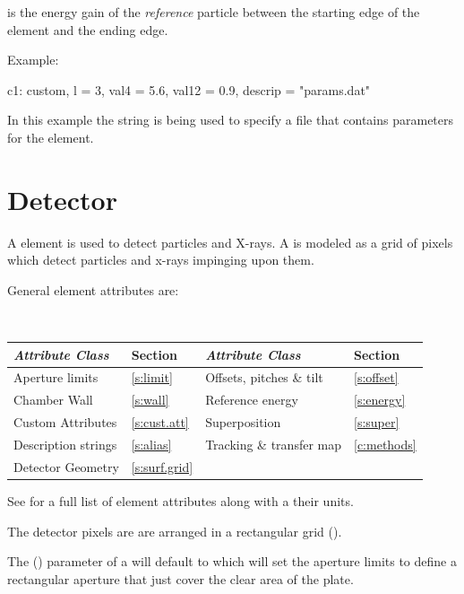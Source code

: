  is the energy gain of the {\it reference} particle
between the starting edge of the element and the ending edge.

Example:
\begin{example}
  c1: custom, l = 3, val4 = 5.6, val12 = 0.9, descrip = "params.dat"
\end{example}
In this example the  string is being used to specify a
file that contains parameters for the element.

\section{Detector}
\label{s:detector}

A  element is used to detect particles and X-rays.  A
 is modeled as a grid of pixels which detect particles and x-rays
impinging upon them.

General  element attributes are:
\begin{center}
\tt 
\begin{tabular}{llll} \toprule
  {\sl Attribute Class}      & Section           & {\sl Attribute Class}      & Section         \\ \midrule
  Aperture limits            & \ref{s:limit}     & Offsets, pitches \& tilt   & \ref{s:offset}  \\
  Chamber Wall               & \ref{s:wall}      & Reference energy           & \ref{s:energy}  \\
  Custom Attributes          & \ref{s:cust.att}  & Superposition              & \ref{s:super}   \\
  Description strings        & \ref{s:alias}     & Tracking \& transfer map   & \ref{c:methods} \\
  Detector Geometry          & \ref{s:surf.grid} &                            &                 \\
  \bottomrule
\end{tabular}
\end{center}
\toffset
See  for a full list of element attributes along with a their units.

The detector pixels are are arranged in a rectangular grid (). 

The  () parameter of a
 will default to  which will set the
aperture limits to define a rectangular aperture that just cover the
clear area of the plate.

